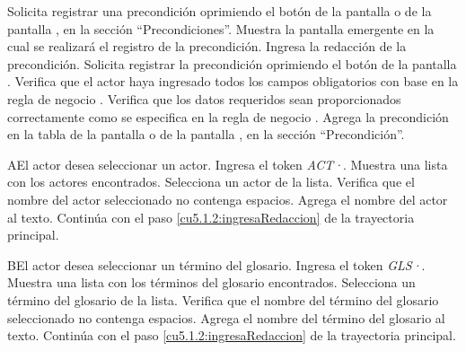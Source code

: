  \begin{UCtrayectoria}
	\UCpaso[\UCactor] Solicita registrar una precondición oprimiendo el botón \btnRegistrar de la pantalla  o de la pantalla , en la sección ``Precondiciones''. 
	\UCpaso[\UCsist] Muestra la pantalla emergente  en la cual se realizará el registro de la precondición. 
	\UCpaso[\UCactor] Ingresa la redacción de la precondición.           \label{cu5.1.2:ingresaRedaccion}
	\UCpaso[\UCactor] Solicita registrar la precondición oprimiendo el botón  de la pantalla .  
	\UCpaso[\UCsist] Verifica que el actor haya ingresado todos los campos obligatorios con base en la regla de negocio . 
	\UCpaso[\UCsist] Verifica que los datos requeridos sean proporcionados correctamente como se especifica en la regla de negocio .  
	\UCpaso[\UCsist] Agrega la precondición en la tabla de la pantalla  o de la pantalla , en la sección ``Precondición''.
\end{UCtrayectoria}

    

 \begin{UCtrayectoriaA}{A}{El actor desea seleccionar un actor.}
 	\UCpaso[\UCactor] Ingresa el token {\it ACT·}.
 	\UCpaso[\UCsist] Muestra una lista con los actores encontrados.
 	\UCpaso[\UCactor] Selecciona un actor de la lista.
  	\UCpaso[\UCsist] Verifica que el nombre del actor seleccionado no contenga espacios. 
  	\UCpaso[\UCsist] Agrega el nombre del actor al texto.
    \UCpaso[] Continúa con el paso \ref{cu5.1.2:ingresaRedaccion} de la trayectoria principal.
 \end{UCtrayectoriaA}
 \begin{UCtrayectoriaA}{B}{El actor desea seleccionar un término del glosario.}
 	\UCpaso[\UCactor] Ingresa el token {\it GLS·}.	
 	\UCpaso[\UCsist] Muestra una lista con los términos del glosario encontrados.
 	\UCpaso[\UCactor] Selecciona un término del glosario de la lista.
  	\UCpaso[\UCsist] Verifica que el nombre del término del glosario seleccionado no contenga espacios. 
  	\UCpaso[\UCsist] Agrega el nombre del término del glosario al texto.
    \UCpaso[] Continúa con el paso \ref{cu5.1.2:ingresaRedaccion} de la trayectoria principal.
 \end{UCtrayectoriaA}

